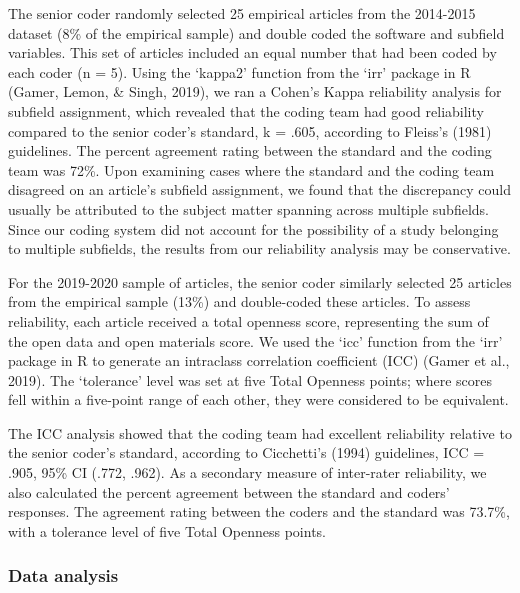 \documentclass[
  english,
  man,floatsintext]{apa6}
\begin{document}
The senior coder randomly selected 25 empirical articles from the 2014-2015 dataset (8\% of the empirical sample) and double coded the software and subfield variables. This set of articles included an equal number that had been coded by each coder (n = 5). Using the `kappa2' function from the `irr' package in R (Gamer, Lemon, \& Singh, 2019), we ran a Cohen's Kappa reliability analysis for subfield assignment, which revealed that the coding team had good reliability compared to the senior coder's standard, k = .605, according to Fleiss's (1981) guidelines. The percent agreement rating between the standard and the coding team was 72\%. Upon examining cases where the standard and the coding team disagreed on an article's subfield assignment, we found that the discrepancy could usually be attributed to the subject matter spanning across multiple subfields. Since our coding system did not account for the possibility of a study belonging to multiple subfields, the results from our reliability analysis may be conservative.

For the 2019-2020 sample of articles, the senior coder similarly selected 25 articles from the empirical sample (13\%) and double-coded these articles. To assess reliability, each article received a total openness score, representing the sum of the open data and open materials score. We used the `icc' function from the `irr' package in R to generate an intraclass correlation coefficient (ICC) (Gamer et al., 2019). The `tolerance' level was set at five Total Openness points; where scores fell within a five-point range of each other, they were considered to be equivalent.

The ICC analysis showed that the coding team had excellent reliability relative to the senior coder's standard, according to Cicchetti's (1994) guidelines, ICC = .905, 95\% CI (.772, .962). As a secondary measure of inter-rater reliability, we also calculated the percent agreement between the standard and coders' responses. The agreement rating between the coders and the standard was 73.7\%, with a tolerance level of five Total Openness points.

\hypertarget{data-analysis}{%
\subsubsection{Data analysis}\label{data-analysis}}
\end{document}
